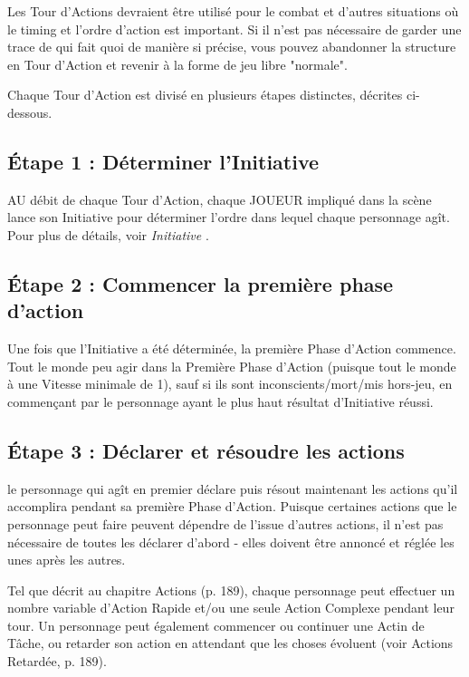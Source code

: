 Les Tour d'Actions devraient être utilisé pour le combat et d'autres situations où le timing et l'ordre d'action est important. Si il n'est pas nécessaire de garder une trace de qui fait quoi de manière si précise, vous pouvez abandonner la structure en Tour d'Action et revenir à la forme de jeu libre "normale". 

Chaque Tour d'Action est divisé en plusieurs étapes distinctes, décrites ci-dessous. 

\subsection{Étape 1 : Déterminer l'Initiative} \label{sec:roll-initiative} 

AU débit de chaque Tour d'Action, chaque JOUEUR impliqué dans la scène lance son Initiative pour déterminer l'ordre dans lequel chaque personnage agît. Pour plus de détails, voir \emph{ Initiative }. 

\subsection{Étape 2 : Commencer la première phase d'action} \label{sec:begin-first-phase} 

Une fois que l'Initiative a été déterminée, la première Phase d'Action commence. Tout le monde peu agir dans la Première Phase d'Action (puisque tout le monde à une Vitesse minimale de 1), sauf si ils sont inconscients/mort/mis hors-jeu, en commençant par le personnage ayant le plus haut résultat d'Initiative réussi. 

\subsection{Étape 3 : Déclarer et résoudre les actions} \label{sec:declare-resolve} 

le personnage qui agît en premier déclare puis résout maintenant les actions qu'il accomplira pendant sa première Phase d'Action. Puisque certaines actions que le personnage peut faire peuvent dépendre de l'issue d'autres actions, il n'est pas nécessaire de toutes les déclarer d'abord - elles doivent être annoncé et réglée les unes après les autres. 

Tel que décrit au chapitre Actions (p. 189), chaque personnage peut effectuer un nombre variable d'Action Rapide et/ou une seule Action Complexe pendant leur tour. Un personnage peut également commencer ou continuer une Actin de Tâche, ou retarder son action en attendant que les choses évoluent (voir Actions Retardée, p. 189). 

